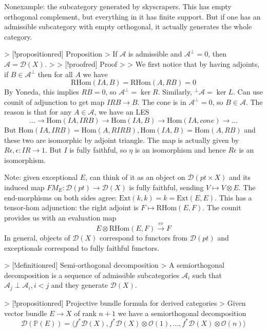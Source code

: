 Nonexample: the subcategory generated by skyscrapers. This has empty orthogonal complement, but everything in it has finite support. But if one has an admissible subcategory with empty orthogonal, it actually generates the whole category.

> [!propositionred] Proposition
> If $\mathcal{A}$ is admissible and $\mathcal{A}^\perp=0$, then $\mathcal{A}=\mathcal{D}(X)$.
> > [!proofred] Proof
> > We first notice that by having adjoints, if $B\in\mathcal{A}^\perp$ then for all $A$ we have $$\mathrm{RHom}(IA, B)=\mathrm{RHom}(A,RB)=0$$By Yoneda, this implies $RB=0$, so $\mathcal{A}^\perp = \ker R$. Similarly, $^\perp \mathcal{A}=\ker L.$ Can use counit of adjunction to get map $IRB\xrightarrow{}B$. The cone is in $\mathcal{A}^\perp=0$, so $B\in \mathcal{A}$.  The reason is that for any $A\in \mathcal{A}$, we have an LES $$\dots\xrightarrow{}\mathrm{Hom}(IA, IRB)\xrightarrow{}\mathrm{Hom}(IA, B)\xrightarrow{}\mathrm{Hom}(IA,cone)\xrightarrow{}\dots$$But $\mathrm{Hom}(IA,IRB)=\mathrm{Hom}(A,RIRB), \mathrm{Hom}(IA,B)=\mathrm{Hom}(A,RB)$ and these two are isomorphic by adjoint triangle. The map is actually given by $R\epsilon, \epsilon: IR\xrightarrow{ }1$.  But $I$ is fully faithful, so $\eta$ is an isomorphism and hence $R\epsilon$ is an isomorphism. 


Note: given exceptional $E$, can think of it as an object on $\mathcal{D}(pt\times X)$ and its induced map $FM_{E}:\mathcal{D}(pt)\xrightarrow{}\mathcal{D}(X)$ is fully faithful, sending $V\mapsto V\otimes E$. The end-morphisms on both sides agree: $\mathrm{Ext}(k,k)=k=\mathrm{Ext}(E,E)$. This has a tensor-hom adjunction: the right adjoint is $F\mapsto \mathrm{RHom}(E,F)$. The counit provides us with an evaluation map $$E\otimes \mathrm{RHom}(E,F)\xrightarrow{ev}F$$In general, objects of $\mathcal{D}(X)$ correspond to functors from $\mathcal{D}(pt)$ and exceptionals correspond to fully faithful functors. 

> [!definitionred] Semi-orthogonal decomposition
> A semiorthogonal decomposition is a sequence of admissible subcategories $\mathcal{A}_{i}$ such that $\mathcal{A}_{j}\perp \mathcal{A}_{i}, i<j$ and they generate $\mathcal{D}(X)$.

> [!propositionred] Projective bundle formula for derived categories
> Given vector bundle $E\rightarrow X$ of rank $n+1$ we have a semiorthogonal decomposition $$\mathcal{D}(\mathbb{P}(E))=\langle f^*\mathcal{D}(X), f^*\mathcal{D}(X)\otimes \mathcal{O}(1),\dots, f^*\mathcal{D}(X)\otimes \mathcal{O}(n)\rangle$$

